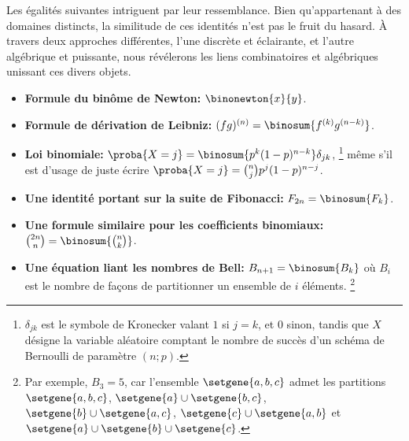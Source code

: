 Les égalités suivantes intriguent par leur ressemblance. Bien qu'appartenant à des domaines distincts, la similitude de ces identités n’est pas le fruit du hasard. À travers deux approches différentes, l'une discrète et éclairante, et l'autre algébrique et puissante, nous révélerons les liens combinatoires et algébriques unissant ces divers objets.
%
\begin{itemize}
    \item \textbf{Formule du binôme de Newton:}
    $\binonewton{x}{y}$.


    \item \textbf{Formule de dérivation de Leibniz:}
    $(fg)^{(n)} = \binosum{f^{(k)} g^{(n-k)}}$.


    \item \textbf{Loi binomiale:}
    $\proba{X = j} = \binosum{p^k (1 - p)^{n-k}} \delta_{jk}$,%
    \footnote{
    	$\delta_{jk}$ est le symbole de Kronecker valant $1$ si $j=k$, et $0$ sinon,
		tandis que
		$X$ désigne la variable aléatoire comptant le nombre de succès d'un schéma de Bernoulli de paramètre $(n ; p)$.
    }
    même s'il est d'usage de juste écrire
    $\proba{X = j} =\binom{n}{j} p^j (1 - p)^{n-j}$.


    \item \textbf{Une identité portant sur la suite de Fibonacci:}
    $F_{2n} = \binosum{F_k}$.


    \item \textbf{Une formule similaire pour les coefficients binomiaux:}
    $\binom{2n}{n} = \binosum{\binom{n}{k}}$.


    \item \textbf{Une équation liant les nombres de Bell:}
    $B_{n+1} = \binosum{B_k}$ où $B_i$ est le nombre de façons de partitionner un ensemble de $i$ éléments.%
    \footnote{
    	Par exemple,
    	$B_3 = 5$,
    	car l'ensemble $\setgene{ a , b , c }$ admet les partitions
    	$\setgene{ a , b , c }$,
    	$\setgene{ a } \cup \setgene{ b , c }$,
    	$\setgene{ b } \cup \setgene{ a , c }$,
    	$\setgene{ c } \cup \setgene{ a , b }$
		et
    	$\setgene{ a } \cup \setgene{ b } \cup \setgene{ c }$.
	}
\end{itemize}